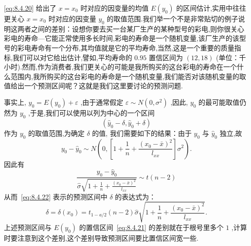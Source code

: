 \eqref{eq:8.4.20} 给出了 $x=x_0$ 时对应的因变量的均值 $E(y_0)$ 的区间估计,实用中往往更关心 $x=x_0$ 时对应的因变量 $y_0$ 的取值范围.我们举一个不是非常贴切的例子说明这两者之间的差别：设想你要去买一台某厂生产的某种型号的彩电,则你很关心彩电的寿命—它能正常使用多长时间,彩电的寿命是一个随机变量,该厂生产的该型号的彩电寿命有一个分布,其均值就是它的平均寿命,当然,这是一个重要的质量指标,我们可以对它给出估计,譬如,平均寿命的 $0.95$ 置信区间为 $(12,18)$ (单位：千小时).然而,作为消费者,我们更关心的可能是我所购买的这台彩电的寿命在一个什么范围内,我所购买的这台彩电的寿命是一个随机变量,我们能否对该随机变量的取值给出一个预测区间呢？这就是我们这里要讨论的预测问题.

事实上, $y_0=E(y_0)+\varepsilon$ ,由于通常假定 $\varepsilon\sim N(0,\sigma^2)$ ,因此, $y_0$ 的最可能取值仍然为 $y_0$ ,于是,我们可以使用以列为中心的一个区间
\begin{equation}\label{eq:8.4.22}
\left( \hat{y}_0-\delta ,\hat{y}_0+\delta \right) 
\end{equation}
作为 $y_0$ 的取值范围,为确定 $\delta$ 的值, 我们需要如下的结果：由于 $y_0$ 与 $\hat{y}_0$ 独立,故
\begin{equation*}
y_{0}-\hat{y}_{0} \sim N\left(0,\left[1+\frac{1}{n}+\frac{\left(x_{0}-\bar{x}\right)^{2}}{l_{x x}}\right] \sigma^{2}\right).
\end{equation*}
因此有
\begin{equation*}
\frac{y_{0}-\hat{y}_{0}}{\hat{\sigma} \sqrt{1+\frac{1}{n}+\frac{\left(x_{0}-\bar{x}\right)^{2}}{l_{x x}}}} \sim t(n-2)
\end{equation*}
从而~\eqref{eq:8.4.22} 表示的预测区间中 $\delta$ 的表达式为：
\begin{equation}
\delta=\delta\left(x_{0}\right)=t_{1-a / 2}(n-2) \hat{\sigma} \sqrt{1+\frac{1}{n}+\frac{\left(x_{0}-\bar{x}\right)^{2}}{l_{x x}}}.\label{eq:8.4.23}
\end{equation}
上述预测区间与 $E(y_0)$ 的置信区间~\eqref{eq:8.4.21} 的差别就在于根号里多个 $1$ ,计算时要注意到这个差别,这个差别导致预测区间要比置信区间宽一些.

